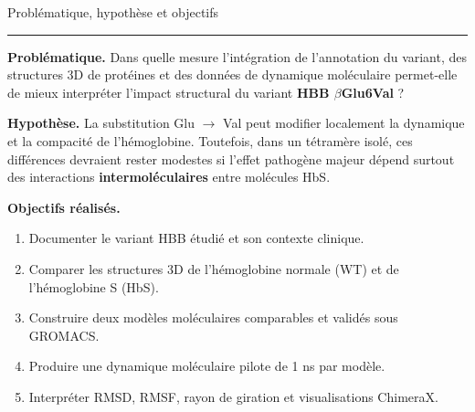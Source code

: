 \documentclass[aspectratio=169,10pt]{beamer}
\newcommand{\slidetitleline}{\par\vspace{-0.3em}\noindent\textcolor{UniBlue}{\rule{\linewidth}{0.7pt}}\par\vspace{0.25em}}
\begin{document}
\begin{frame}[shrink=5]{Problématique, hypothèse et objectifs}
\slidetitleline
\small
\textbf{Problématique.} Dans quelle mesure l'intégration de l'annotation du variant, des structures 3D de protéines et des données de dynamique moléculaire permet-elle de mieux interpréter l'impact structural du variant \textbf{HBB \(\beta\)Glu6Val} ?

\vspace{0.5em}
\textbf{Hypothèse.} La substitution Glu \(\rightarrow\) Val peut modifier localement la dynamique et la compacité de l'hémoglobine. Toutefois, dans un tétramère isolé, ces différences devraient rester modestes si l'effet pathogène majeur dépend surtout des interactions \textbf{intermoléculaires} entre molécules HbS.

\vspace{0.6em}
\textbf{Objectifs réalisés.}
\begin{enumerate}\footnotesize
  \item Documenter le variant HBB étudié et son contexte clinique.
  \item Comparer les structures 3D de l'hémoglobine normale (WT) et de l'hémoglobine S (HbS).
  \item Construire deux modèles moléculaires comparables et validés sous GROMACS.
  \item Produire une dynamique moléculaire pilote de 1 ns par modèle.
  \item Interpréter RMSD, RMSF, rayon de giration et visualisations ChimeraX.
\end{enumerate}
\end{frame}
\end{document}
